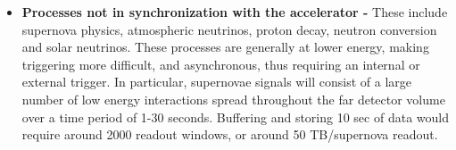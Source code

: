 \begin{itemize}
%






\item {\bf Processes not in synchronization with the accelerator -} These include supernova physics, atmospheric neutrinos, proton decay, neutron conversion and solar neutrinos.  These processes are generally at lower energy, making triggering more difficult, and asynchronous, thus requiring an internal or external trigger.  In particular, supernovae signals will consist of a large number of low energy interactions spread throughout the far detector volume over a time period of 1-30 seconds. Buffering and storing 10 sec of data would require around 2000 readout windows, or around 50 TB/supernova readout.  


\end{itemize}
